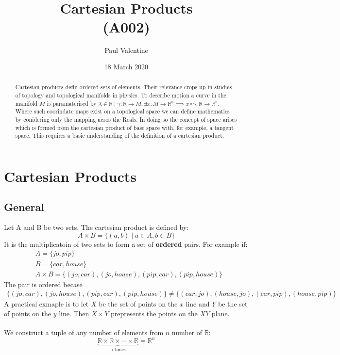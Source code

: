 \documentclass[a4paper]{article}
\title{\textbf{Cartesian Products}\\(A002)}
\author{Paul Valentine}
\date{18 March 2020}
\begin{document}
\maketitle
\begin{abstract}%
  Cartesian products defin ordered sets of elements. Their relevance crops up in studies of topology and topological manifolds in physics. To describe motion a curve in the manifold $M$ is paramaterised by $\lambda \in \mathbb{R} \mid \gamma : \mathbb{R} \to M , \exists x:M \to \mathbb{R}^n \implies x \circ \gamma : \mathbb{R} \to \mathbb{R}^n$. Where such coorindate maps exist on a topological space we can define mathematics by conidering only the mapping acros the Reals. In doing so the concept of space arises which is formed from the cartesian product of base space with, for example, a tangent space. This requires a basic understanding of the definition of a cartesian product.
\end{abstract}
\section{Cartesian Products}
\subsection{General}
Let A and B be two sets. The cartesian product is defined by:
\begin{equation}
A \times B = \{(a,b)\mid a\in A, b\in B\}
\end{equation}
It is the multiplicatoin of two sets to form a set of \textbf{ordered} pairs. For example if:
\begin{align*}
&A=\{ jo, pip \}\\
&B = \{car, house\}\\
&A\times B = \{(jo,car),(jo,house),(pip,car),(pip,house)\}
\end{align*}
The pair is ordered becase
\begin{align*}
  \{(jo,car),(jo,house),(pip,car),(pip,house)\} \neq \{(car,jo),(house,jo),(car,pip),(house,pip)\}
\end{align*}
A practical exmaple is to let $X$ be the set of points on the $x$ line and $Y$ be the set of points on the $y$ line. Then $X \times Y$ prepresents the points on the $XY$ plane.\\ \\
We construct a tuple of any number of elements from $n$ number of $\mathbb{R}$:
\begin{equation}
\underbrace{\mathbb{R} \times \mathbb{R} \times \cdots \times \mathbb{R}}_{\text{n times}}=\mathbb{R}^n
\end{equation}
\end{document}
